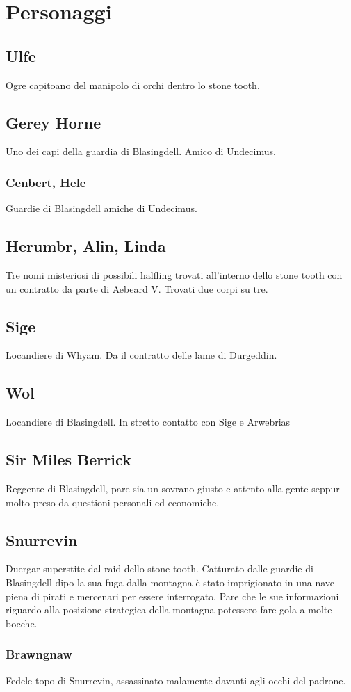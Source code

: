 \documentclass[10pt,twoside,twocolumn]{article}
\begin{document}
\section{Personaggi}
\subsection{Ulfe}
Ogre capitoano del manipolo di orchi dentro lo stone tooth.
\subsection{Gerey Horne}
Uno dei capi della guardia di Blasingdell. Amico di Undecimus.
\subsubsection{Cenbert, Hele}
Guardie di Blasingdell amiche di Undecimus.
\subsection{Herumbr, Alin, Linda}
Tre nomi misteriosi di possibili halfling trovati all'interno
dello stone tooth con un contratto da parte di Aebeard V.
Trovati due corpi su tre.
\subsection{Sige}
Locandiere di Whyam. Da il contratto delle lame di Durgeddin.
\subsection{Wol}
Locandiere di Blasingdell. In stretto contatto con Sige e Arwebrias
\subsection{Sir Miles Berrick}
Reggente di Blasingdell, pare sia un sovrano giusto e attento alla gente
seppur molto preso da questioni personali ed economiche.
\subsection{Snurrevin}
Duergar superstite dal raid dello stone tooth. Catturato dalle guardie di
Blasingdell dipo la sua fuga dalla montagna \`e stato imprigionato in una
nave piena di pirati e mercenari per essere interrogato. Pare che le
sue informazioni riguardo alla posizione strategica della montagna
potessero fare gola a molte bocche.
\subsubsection{Brawngnaw}
Fedele topo di Snurrevin, assassinato malamente davanti agli occhi del padrone.
\end{document}
